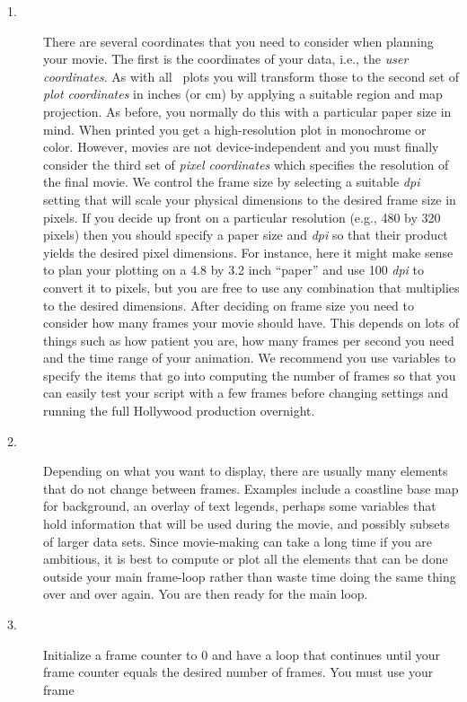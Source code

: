\begin{description}

\item [1.] There are several coordinates that you need to consider when planning
your movie.  The first is the coordinates of your data, i.e., the \emph{user
coordinates}.  As with all \GMT\ plots you will transform those to the
second set of \emph{plot coordinates} 
in inches (or cm) by applying a suitable region and map projection.  As
before, you normally do this with a particular paper size in mind.  When
printed you get a high-resolution plot in monochrome or color.
However, movies are not device-independent and you must finally consider
the third set of \emph{pixel coordinates} which specifies the resolution of the final movie.
We control the frame size by selecting a suitable {\it dpi} setting that
will scale your physical dimensions to the desired frame size in pixels.
If you decide up front on a particular resolution (e.g., 480 by 320 pixels)
then you should specify a paper size and {\it dpi} so that their product yields the desired pixel dimensions.
For instance, here it might make sense to plan your plotting on a 4.8 by 3.2 inch ``paper''
and use 100 {\it dpi} to convert it to pixels, but you are free to use any combination
that multiplies to the desired dimensions.  After deciding on frame size you need
to consider how many frames your movie should have.  This depends on lots of things
such as how patient you are, how many frames per second you need and the time
range of your animation.  We recommend you use variables to specify the items that
go into computing the number of frames so that you can easily test your script
with a few frames before changing settings and running the full Hollywood production overnight.
\item [2.] Depending on what you want to display, there are usually many elements that
do not change between frames.  Examples include a coastline base map for background,
an overlay of text legends, perhaps some variables that hold information that will
be used during the movie, and possibly subsets of larger data sets.  Since movie-making
can take a long time if you are ambitious, it is best to compute or plot all the
elements that can be done outside your main frame-loop rather than waste time
doing the same thing over and over again.  You are then ready for the main loop.
\item [3.]  Initialize a frame counter to 0 and have a loop that continues until
your frame counter equals the desired number of frames.  You must use your frame

\end{description}
